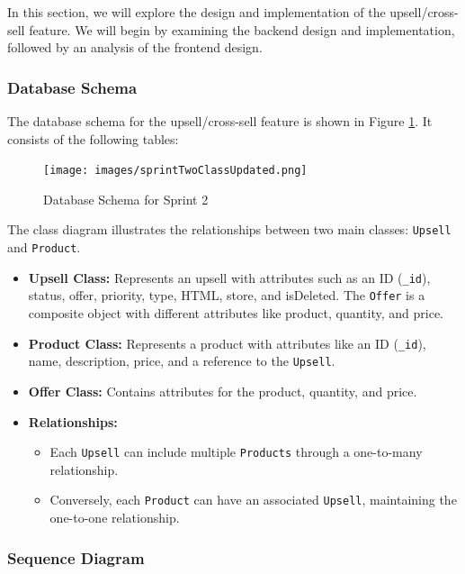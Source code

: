In this section, we will explore the design and implementation of the upsell/cross-sell feature. We will begin by examining the backend design and implementation, followed by an analysis of the frontend design.

\subsubsection{Database Schema}

The database schema for the upsell/cross-sell feature is shown in Figure \ref{fig:db_schema_sprint2}. It consists of the following tables:

\begin{figure}[H]
    \centering
    \texttt{[image: images/sprintTwoClassUpdated.png]}
    \caption{Database Schema for Sprint 2}
    \label{fig:db_schema_sprint2}
\end{figure}

The class diagram illustrates the relationships between two main classes: \texttt{Upsell} and \texttt{Product}.

\begin{itemize}
    \item \textbf{Upsell Class:} Represents an upsell with attributes such as an ID (\texttt{\_id}), status, offer, priority, type, HTML, store, and isDeleted. The \texttt{Offer} is a composite object with different attributes like product, quantity, and price.
    
    \item \textbf{Product Class:} Represents a product with attributes like an ID (\texttt{\_id}), name, description, price, and a reference to the \texttt{Upsell}.
    
    \item \textbf{Offer Class:} Contains attributes for the product, quantity, and price.
    
    \item \textbf{Relationships:}
    \begin{itemize}
        \item Each \texttt{Upsell} can include multiple \texttt{Products} through a one-to-many relationship.
        \item Conversely, each \texttt{Product} can have an associated \texttt{Upsell}, maintaining the one-to-one relationship.
    \end{itemize}
\end{itemize}

\subsubsection{Sequence Diagram}

